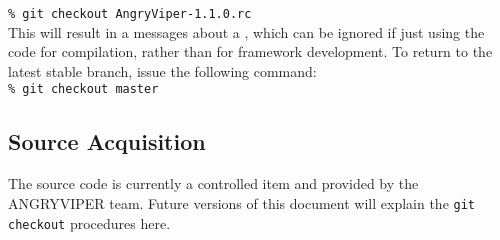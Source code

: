 \begin{appendices}
\verb+% git checkout AngryViper-1.1.0.rc+\\

This will result in a messages about a , which can be ignored if just using the code for compilation, rather than for framework development. To return to the latest stable branch, issue the following command:\\

\verb+% git checkout master+
\else
\subsection{Source Acquisition}
The source code is currently a controlled item and provided by the ANGRYVIPER team. Future versions of this document will explain the \texttt{git checkout} procedures here.
\fi

\iffalse
\subsection{Setting up the Build Environment}
\label{subsec:setup_build_environment}
Before building the framework and its assets there are a series of environment variables that need to be set. These environment variables are used to set the paths to Modelsim, Xilinx Vivado, Xilinx ISE, and/or Altera Quartus. The easiest method is to use copy and then modify the script  \verb+env/example_source_build.sh+ to the base checkout directory. After copying renaming the file to \verb+build_from_source.sh+. The script sets up a number of variables required to build both the framework and the provided assets. The most critical ones are: \verb+OCPI_CDK_DIR+ \verb+OCPI_BUILD_SHARED_LIBRARIES+. The values of these should be:\newline\par
\verb+OCPI_CDK_DIR+ - location to the checked out code and a folder named exports within the folder \newline
\verb+OCPI_BUILD_SHARED_LIBRARIES+ - always set to 0\newline \par
If it is desired to utilize an other vendor tools the appropriate environment variables should be set. Please refer to the \verb+env/example_source_build.sh+ for details.
Once the variables have been set correctly and the file copied, source the script by calling:
\verb+% source build_from_source.sh+
\fi


\end{appendices}
